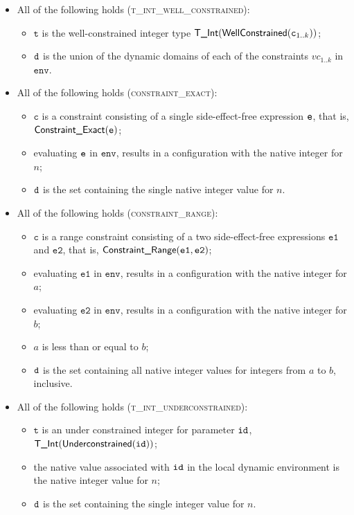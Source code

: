 \documentclass{book}
\newcommand\env[0]{\texttt{env}}
\newcommand\vc[0]{\texttt{c}}
\newcommand\vt[0]{\texttt{t}}
\newcommand\veone[0]{\texttt{e1}}
\newcommand\vetwo[0]{\texttt{e2}}
\begin{document}
\begin{itemize}
  \item All of the following holds (\textsc{t\_int\_well\_constrained}):
  \begin{itemize}
    \item $\vt$ is the well-constrained integer type $\TInt(\wellconstrained(\vc_{1..k}))$;
    \item $\texttt{d}$ is the union of the dynamic domains of each of the constraints $vc_{1..k}$ in $\env$.
  \end{itemize}

  \item All of the following holds (\textsc{constraint\_exact}):
  \begin{itemize}
    \item $\vc$ is a constraint consisting of a single side-effect-free expression $\texttt{e}$, that is, $\textsf{Constraint\_Exact}(\texttt{e})$;
    \item evaluating $\texttt{e}$ in $\env$, results in a configuration with the native integer for $n$;
    \item $\texttt{d}$ is the set containing the single native integer value for $n$.
  \end{itemize}

  \item All of the following holds (\textsc{constraint\_range}):
  \begin{itemize}
    \item $\vc$ is a range constraint consisting of a two side-effect-free expressions $\veone$ and $\vetwo$, that is, $\ConstraintRange(\veone, \vetwo)$;
    \item evaluating $\veone$ in $\env$, results in a configuration with the native integer for $a$;
    \item evaluating $\vetwo$ in $\env$, results in a configuration with the native integer for $b$;
    \item $a$ is less than or equal to $b$;
    \item $\texttt{d}$ is the set containing all native integer values for integers from $a$ to $b$, inclusive.
  \end{itemize}

  \item All of the following holds (\textsc{t\_int\_underconstrained}):
  \begin{itemize}
    \item $\vt$ is an under constrained integer for parameter $\texttt{id}$, \\ $\textsf{T\_Int}(\textsf{Underconstrained}(\texttt{id}))$;
    \item the native value associated with $\texttt{id}$ in the local dynamic environment is the native integer value for $n$;
    \item $\texttt{d}$ is the set containing the single integer value for $n$.
  \end{itemize}


\end{itemize}
\end{document}
